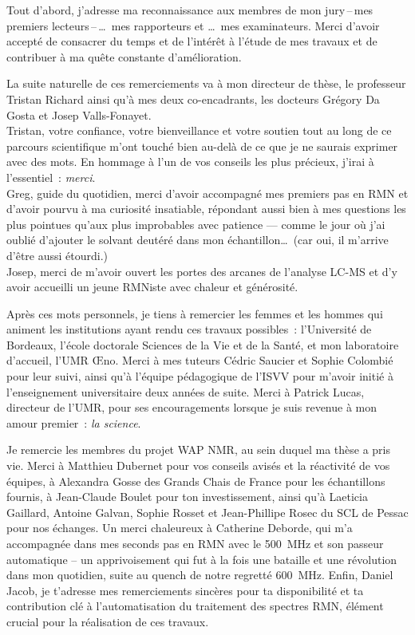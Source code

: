 {\setlength{\parskip}{0.4em}\setlength{\parindent}{0.8em}\begingroup{}\SingleSpacing%
Tout d'abord, j'adresse ma reconnaissance aux membres de mon jury\,--\,mes premiers lecteurs\,--\,\dots\ mes rapporteurs et \dots\ mes examinateurs. Merci d'avoir accepté de consacrer du temps et de l'intérêt à l'étude de mes travaux et de contribuer à ma quête constante d'amélioration.

La suite naturelle de ces remerciements va à mon directeur de thèse, le professeur Tristan Richard ainsi qu'à mes deux co-encadrants, les docteurs Grégory Da Gosta et Josep Valls-Fonayet.\\[0.15\baselineskip]Tristan, votre confiance, votre bienveillance et votre soutien tout au long de ce parcours scientifique m'ont touché bien au-delà de ce que je ne saurais exprimer avec des mots. En hommage à l'un de vos conseils les plus précieux, j'irai à l'essentiel~: \textit{merci}.\\
Greg, guide du quotidien, merci d'avoir accompagné mes premiers pas en RMN et d'avoir pourvu à ma curiosité insatiable, répondant aussi bien à mes questions les plus pointues qu'aux plus improbables avec patience --- comme le jour où j'ai oublié d'ajouter le solvant deutéré dans mon échantillon\dots\ (car oui, il m'arrive d'être aussi étourdi.)\\Josep, merci de m'avoir ouvert les portes des arcanes de l'analyse LC-MS et d'y avoir accueilli un jeune RMNiste avec chaleur et générosité.

Après ces mots personnels, je tiens à remercier les femmes et les hommes qui animent les institutions ayant rendu ces travaux possibles~: l'Université de Bordeaux, l'école doctorale Sciences de la Vie et de la Santé, et mon laboratoire d'accueil, l'UMR \OE no. Merci à mes tuteurs Cédric Saucier et Sophie Colombié pour leur suivi, ainsi qu'à l'équipe pédagogique de l'ISVV pour m'avoir initié à l'enseignement universitaire deux années de suite. Merci à Patrick Lucas, directeur de l'UMR, pour ses encouragements lorsque je suis revenue à mon amour premier~: \textit{la science}.

Je remercie les membres du projet WAP NMR, au sein duquel ma thèse a pris vie. Merci à Matthieu Dubernet pour vos conseils avisés et la réactivité de vos équipes, à Alexandra Gosse des Grands Chais de France pour les échantillons fournis, à Jean-Claude Boulet pour ton investissement, ainsi qu'à Laeticia Gaillard, Antoine Galvan, Sophie Rosset et Jean-Phillipe Rosec du SCL de Pessac pour nos échanges. Un merci chaleureux à Catherine Deborde, qui m'a accompagnée dans mes seconds pas en RMN avec le 500~MHz et son passeur automatique -- un apprivoisement qui fut à la fois une bataille et une révolution dans mon quotidien, suite au quench de notre regretté 600~MHz. Enfin, Daniel Jacob, je t'adresse mes remerciements sincères pour ta disponibilité et ta contribution clé à l'automatisation du traitement des spectres RMN, élément crucial pour la réalisation de ces travaux.

}
